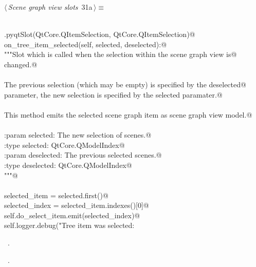 \documentclass[
    a4paper,      %
    10pt,         %
    openright,    %
    notitlepage,  %
    parskip=half, %
]{scrreprt}       %
\theoremstyle{definition}                    %
\begin{document}
\begin{flushleft} \small
\begin{minipage}{\linewidth}\label{scrap34}\raggedright\small
{} $\langle\,${\itshape Scene graph view slots}\nobreak\ {\footnotesize {31a}}$\,\rangle\equiv$
\vspace{-1exm}
\begin{list}{}{} \item
\mbox{}\lstinline@@\\
\mbox{}\lstinline@QtCore.pyqtSlot(QtCore.QItemSelection, QtCore.QItemSelection)@\\
\mbox{}\lstinline@def on_tree_item_selected(self, selected, deselected):@\\
\mbox{}\lstinline@    """Slot which is called when the selection within the scene graph view is@\\
\mbox{}\lstinline@    changed.@\\
\mbox{}\lstinline@@\\
\mbox{}\lstinline@    The previous selection (which may be empty) is specified by the deselected@\\
\mbox{}\lstinline@    parameter, the new selection is specified by the selected paramater.@\\
\mbox{}\lstinline@@\\
\mbox{}\lstinline@    This method emits the selected scene graph item as scene graph view model.@\\
\mbox{}\lstinline@@\\
\mbox{}\lstinline@    :param selected: The new selection of scenes.@\\
\mbox{}\lstinline@    :type  selected: QtCore.QModelIndex@\\
\mbox{}\lstinline@    :param deselected: The previous selected scenes.@\\
\mbox{}\lstinline@    :type  deselected: QtCore.QModelIndex@\\
\mbox{}\lstinline@    """@\\
\mbox{}\lstinline@@\\
\mbox{}\lstinline@    selected_item = selected.first()@\\
\mbox{}\lstinline@    selected_index = selected_item.indexes()[0]@\\
\mbox{}\lstinline@    self.do_select_item.emit(selected_index)@\\
\mbox{}\lstinline@    self.logger.debug("Tree item was selected: %s" % selected_index)@{\NWsep}
\end{list}
\vspace{-1.5ex}
\footnotesize
\begin{list}{}{\setlength{\itemsep}{-\parsep}\setlength{\itemindent}{-\leftmargin}}
\item \NWtxtMacroDefBy\ .
\item \NWtxtMacroRefIn\ .

\item{}
\end{list}
\end{minipage}\vspace{4ex}
\end{flushleft}
\end{document}
